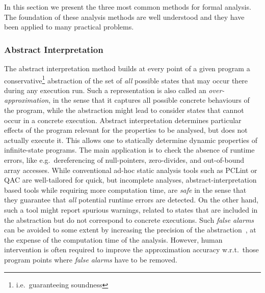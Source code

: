 \documentclass{template/openetcs_report}
\newcommand{\cxx}{C\nolinebreak[4]\hspace{-.05em}\raisebox{.3ex}{\footnotesize\bf ++}\xspace}
\begin{document}
In this section we present
the three most common methods for formal analysis.
The foundation of these analysis
methods are well understood and they have been
applied to many practical problems.


\subsubsection{Abstract Interpretation}
\label{sec:Abstract Interpretation}

The abstract interpretation method
\cite{Cousot.Cousot.1976}
builds at every point of a given program a conservative\footnote{
        i.e.\ guaranteeing soundness
}
abstraction
of the set of \emph{all} possible states that may occur there
during any execution run. Such a representation is also called an 
\emph{over-approximation}, in the sense that it captures all possible
concrete behaviours of the program, while the abstraction might lead to 
consider states that cannot occur in a concrete execution.
%
Abstract interpretation 
determines particular effects of the program relevant for the
properties to be analysed, but does not actually execute it.
%
This allows one to statically determine dynamic properties of
infinite-state programs.
%
The main application is to check the absence of runtime errors, like
e.g.\ dereferencing of null-pointers, zero-divides,
and out-of-bound array accesses.
%
While conventional ad-hoc static analysis tools such as PCLint or \mbox{QA\cxx}
are well-tailored for quick, but incomplete analyses,
abstract-interpretation based tools while requiring more computation time, are
\emph{safe} in the sense that they guarantee that {\em all} potential
runtime errors are detected. On the other hand, such a tool might report 
spurious warnings, related to states that are included in the abstraction but
do not correspond to concrete executions. Such \emph{false alarms} can be
avoided to some extent by increasing the precision of the 
abstraction~\cite{Souyris.Delmas.2007},
at the expense of the computation time of the analysis. However,
%
human intervention is often required to improve the approximation accuracy
w.r.t.\ those program points where {\em false alarms}
have to be removed.
\end{document}
